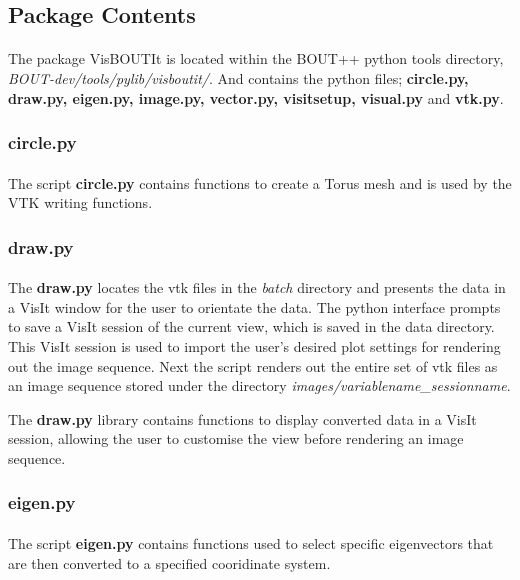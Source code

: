 \documentclass[12pt,a4paper]{article}
\begin{document}
	\subsection{Package Contents}	
	\paragraph{}
	The package VisBOUTIt is located within the BOUT++ python tools directory, \textit{BOUT-dev/tools/pylib/visboutit/}. And contains the python files; \textbf{circle.py, draw.py, eigen.py, image.py, vector.py, visitsetup, visual.py} and \textbf{vtk.py}.
	
	\subsubsection{circle.py}
	\paragraph{}
	The script \textbf{circle.py} contains functions to create a Torus mesh and is used by the VTK writing functions.
	
	\subsubsection{draw.py}
	\paragraph{}
	The \textbf{draw.py} locates the vtk files in the \textit{batch} directory and presents the data in a VisIt window for the user to orientate the data. The python interface prompts to save a VisIt session of the current view, which is saved in the data directory. This VisIt session is used to import the user's desired plot settings for rendering out the image sequence. Next the script renders out the entire set of vtk files as an image sequence stored under the directory \textit{images/variablename\_sessionname}.
	
	The \textbf{draw.py} library contains functions to display converted data in a VisIt session, allowing the user to customise the view before rendering an image sequence.
	
	\subsubsection{eigen.py}
	\paragraph{}
	The script \textbf{eigen.py} contains functions used to select specific eigenvectors that are then converted to a specified cooridinate system.
	
\end{document}
